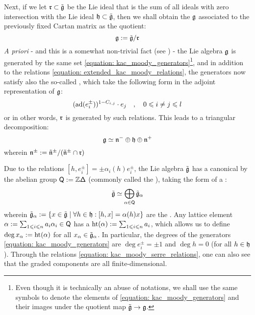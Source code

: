 Next, if we let $\mathfrak{r} \subset \tilde{\mathfrak{g}}$ be the Lie ideal that is the sum of all ideals with zero intersection with the Lie ideal $\mathfrak{h} \subset \tilde{\mathfrak{g}}$, then we shall obtain the  $\mathfrak{g}$ associated to the previously fixed Cartan matrix as the quotient:
    $$\mathfrak{g} := \tilde{\mathfrak{g}}/\mathfrak{r}$$
\textit{A priori} - and this is a somewhat non-trivial fact (see \cite[Theorem 9.11]{kac_infinite_dimensional_lie_algebras}) - the Lie algebra $\mathfrak{g}$ is generated by the same set \eqref{equation: kac_moody_generators}\footnote{Even though it is technically an abuse of notations, we shall use the same symbols to denote the elements of \eqref{equation: kac_moody_generators} and their images under the quotient map $\tilde{\mathfrak{g}} \to \mathfrak{g}$.}, and in addition to the relations \eqref{equation: extended_kac_moody_relations}, the generators now satisfy also the so-called , which take the following form in the adjoint representation of $\mathfrak{g}$:
    \begin{equation} \label{equation: kac_moody_serre_relations}
        ( \mathrm{ad}( e_i^{\pm} ) )^{1 - C_{i, j}} \cdot e_j \quad, \quad 0 \leqslant i \not = j \leqslant l
    \end{equation}
or in other words, $\mathfrak{r}$ is generated by such relations. This leads to a triangular decomposition:
    $$\mathfrak{g} \simeq \mathfrak{n}^- \oplus \mathfrak{h} \oplus \mathfrak{n}^+$$
wherein $\mathfrak{n}^{\pm} := \tilde{\mathfrak{n}}^{\pm}/( \tilde{\mathfrak{n}}^{\pm} \cap \mathfrak{r} )$

Due to the relations $[h, e_i^{\pm}] = \pm \alpha_i(h) e_i^{\pm}$, the Lie algebra $\tilde{\mathfrak{g}}$ has a canonical  by the abelian group $\mathsf{Q} := \mathbb{Z} \mathsf{\Delta}$ (commonly called the ), taking the form of a :
    $$\tilde{\mathfrak{g}} \simeq \bigoplus_{\alpha \in \mathsf{Q}} \tilde{\mathfrak{g}}_{\alpha}$$
wherein $\tilde{\mathfrak{g}}_{\alpha} := \{ x \in \tilde{\mathfrak{g}} \mid \forall h \in \mathfrak{h}: [h, x] = \alpha(h) x \}$ are the . Any lattice element $\alpha := \sum_{1 \leqslant i \leqslant n} a_i \alpha_i \in \mathsf{Q}$ has a  $\operatorname{ht}(\alpha) := \sum_{1 \leqslant i \leqslant n} a_i$, which allows us to define $\deg x_{\alpha} := \operatorname{ht}(\alpha)$ for all $x_{\alpha} \in \tilde{\mathfrak{g}}_{\alpha}$. In particular, the degrees of the generators \eqref{equation: kac_moody_generators} are $\deg e_i^{\pm} = \pm 1$ and $\deg h = 0$ (for all $h \in \mathfrak{h}$). Through the relations \eqref{equation: kac_moody_serre_relations}, one can also see that the graded components are all finite-dimensional.

